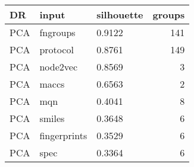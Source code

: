 \begin{tabular}{lllr}
\toprule
    DR &         input & silhouette &  groups \\
\midrule
   PCA &      fngroups &     0.9122 &     141 \\
   PCA &      protocol &     0.8761 &     149 \\
   PCA &      node2vec &     0.8569 &       3 \\
   PCA &         maccs &     0.6563 &       2 \\
   PCA &           mqn &     0.4041 &       8 \\
   PCA &        smiles &     0.3648 &       6 \\
   PCA &  fingerprints &     0.3529 &       6 \\
   PCA &          spec &     0.3364 &       6 \\
\bottomrule
\end{tabular}